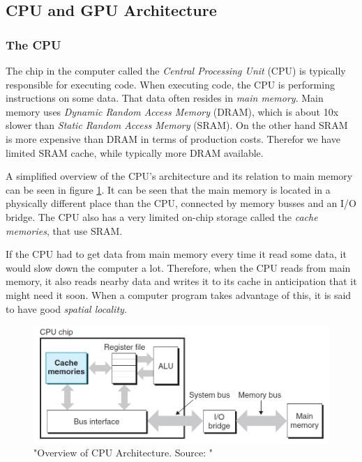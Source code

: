 

\newpage
\subsection{CPU and GPU Architecture}

\subsubsection{The CPU}

The chip in the computer called the \textit{Central Processing Unit} (CPU) is typically responsible for executing code. When executing code, the CPU is performing instructions on some data. That data often resides in \textit{main memory}. Main memory uses \textit{Dynamic Random Access Memory} (DRAM), which is about 10x slower than \textit{Static Random Access Memory} (SRAM). On the other hand SRAM is more expensive than DRAM in terms of production costs.\cite[p. 617-618]{computersystems} Therefor we have limited SRAM cache, while typically more DRAM available. 

A simplified overview of the CPU's architecture and its relation to main memory can be seen in figure \ref{fig:cpu_architecture}. It can be seen that the main memory is located in a physically different place than the CPU, connected by memory busses and an I/O bridge. The CPU also has a very limited on-chip storage called the \textit{cache memories}, that use SRAM.

If the CPU had to get data from main memory every time it read some data, it would slow down the computer a lot. Therefore, when the CPU reads from main memory, it also reads nearby data and writes it to its cache in anticipation that it might need it soon. When a computer program takes advantage of this, it is said to have good \textit{spatial locality}.\cite[p. 640]{computersystems}

\begin{figure}[h]
\includegraphics[width=\textwidth]{Documents/Report/Figures/CPU Architecture.png}
\caption{"Overview of CPU Architecture. Source: \cite[Figure 1.8]{computersystems}"}
\label{fig:cpu_architecture}
\end{figure}

